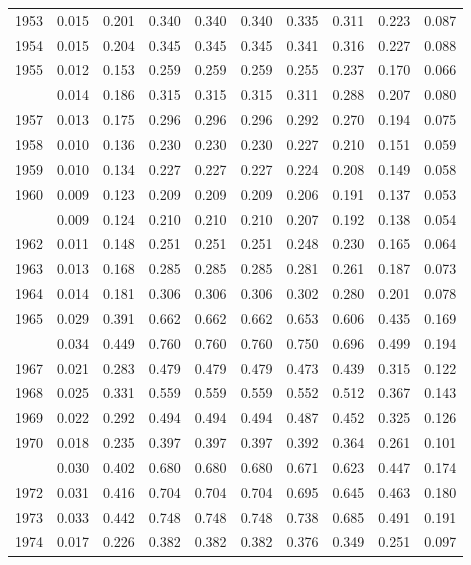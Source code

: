 \documentclass[
]{article}
\begin{document}
\begin{longtable}[t]{lrrrrrrrrr}
1953 & 0.015 & 0.201 & 0.340 & 0.340 & 0.340 & 0.335 & 0.311 & 0.223 & 0.087\\
1954 & 0.015 & 0.204 & 0.345 & 0.345 & 0.345 & 0.341 & 0.316 & 0.227 & 0.088\\
1955 & 0.012 & 0.153 & 0.259 & 0.259 & 0.259 & 0.255 & 0.237 & 0.170 & 0.066\\
\addlinespace
1956 & 0.014 & 0.186 & 0.315 & 0.315 & 0.315 & 0.311 & 0.288 & 0.207 & 0.080\\
1957 & 0.013 & 0.175 & 0.296 & 0.296 & 0.296 & 0.292 & 0.270 & 0.194 & 0.075\\
1958 & 0.010 & 0.136 & 0.230 & 0.230 & 0.230 & 0.227 & 0.210 & 0.151 & 0.059\\
1959 & 0.010 & 0.134 & 0.227 & 0.227 & 0.227 & 0.224 & 0.208 & 0.149 & 0.058\\
1960 & 0.009 & 0.123 & 0.209 & 0.209 & 0.209 & 0.206 & 0.191 & 0.137 & 0.053\\
\addlinespace
1961 & 0.009 & 0.124 & 0.210 & 0.210 & 0.210 & 0.207 & 0.192 & 0.138 & 0.054\\
1962 & 0.011 & 0.148 & 0.251 & 0.251 & 0.251 & 0.248 & 0.230 & 0.165 & 0.064\\
1963 & 0.013 & 0.168 & 0.285 & 0.285 & 0.285 & 0.281 & 0.261 & 0.187 & 0.073\\
1964 & 0.014 & 0.181 & 0.306 & 0.306 & 0.306 & 0.302 & 0.280 & 0.201 & 0.078\\
1965 & 0.029 & 0.391 & 0.662 & 0.662 & 0.662 & 0.653 & 0.606 & 0.435 & 0.169\\
\addlinespace
1966 & 0.034 & 0.449 & 0.760 & 0.760 & 0.760 & 0.750 & 0.696 & 0.499 & 0.194\\
1967 & 0.021 & 0.283 & 0.479 & 0.479 & 0.479 & 0.473 & 0.439 & 0.315 & 0.122\\
1968 & 0.025 & 0.331 & 0.559 & 0.559 & 0.559 & 0.552 & 0.512 & 0.367 & 0.143\\
1969 & 0.022 & 0.292 & 0.494 & 0.494 & 0.494 & 0.487 & 0.452 & 0.325 & 0.126\\
1970 & 0.018 & 0.235 & 0.397 & 0.397 & 0.397 & 0.392 & 0.364 & 0.261 & 0.101\\
\addlinespace
1971 & 0.030 & 0.402 & 0.680 & 0.680 & 0.680 & 0.671 & 0.623 & 0.447 & 0.174\\
1972 & 0.031 & 0.416 & 0.704 & 0.704 & 0.704 & 0.695 & 0.645 & 0.463 & 0.180\\
1973 & 0.033 & 0.442 & 0.748 & 0.748 & 0.748 & 0.738 & 0.685 & 0.491 & 0.191\\
1974 & 0.017 & 0.226 & 0.382 & 0.382 & 0.382 & 0.376 & 0.349 & 0.251 & 0.097\\

\end{longtable}
\end{document}

